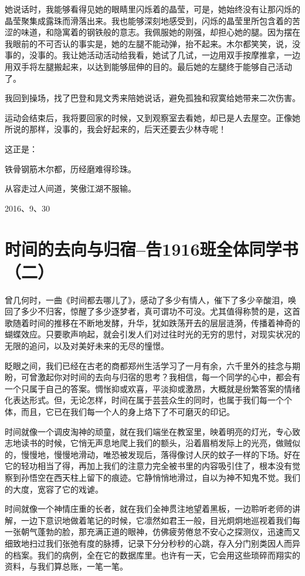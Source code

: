\documentclass[openany]{ctexbook}
\begin{document}
她说话时，我能够看得见她的眼睛里闪烁着的晶莹，可是，她始终没有让那闪烁的晶莹聚集成露珠而滑落出来。我也能够深刻地感受到，闪烁的晶莹里所包含着的苦涩的味道，和隐寓着的钢铁般的意志。我佩服她的刚强，却担心她的腿。因为摆在我眼前的不可否认的事实是，她的左腿不能动弹，抬不起来。木尔都笑笑，说，没事的，没事的。我让她活动活动给我看，她试了几试，一边用双手按摩推拿，一边用双手将左腿搬起来，以达到能够屈伸的目的。最后她的左腿终于能够自己活动了。

我回到操场，找了巴登和晁文秀来陪她说话，避免孤独和寂寞给她带来二次伤害。

运动会结束后，我将要回家的时候，又到观察室去看她，却已是人去屋空。正像她所说的那样，没事的，我会好起来的，后天还要去少林寺呢！

这正是：

铁骨钢筋木尔都，历经磨难得珍珠。

从容走过人间道，笑傲江湖不服输。

2016、9、30

\chapter*{时间的去向与归宿--告1916班全体同学书（二）}\label{letter2}

曾几何时，一曲《时间都去哪儿了》，感动了多少有情人，催下了多少辛酸泪，唤回了多少不归客，惊醒了多少逐梦者，真可谓功不可没。尤其值得称赞的是，这首歌随着时间的推移在不断地发酵，升华，犹如跌荡开去的层层涟漪，传播着神奇的蝴蝶效应。只要歌声响起，就会引发人们对过往时光的无穷的思忖，对现实状况的无限的追问，以及对美好未来的无尽的憧憬。

眨眼之间，我们已经在古老的商都郑州生活学习了一月有余，六千里外的挂念与期盼，可曾激起你对时间的去向与归宿的思考？我相信，每一个同学的心中，都会有一个只属于自己的答案。惆怅抑或欢喜，平淡抑或激昂，大概就是纷繁答案的情绪化表达形式。但，无论怎样，时间在属于芸芸众生的同时，也属于我们每一个个体，而且，它已在我们每一个人的身上烙下了不可磨灭的印记。

时间就像一个调皮淘神的顽童，就在我们端坐在教室里，映着明亮的灯光，专心致志地读书的时候，它悄无声息地爬上我们的额头，沿着眉梢发际上的光亮，做贼似的，慢慢地，慢慢地滑动，唯恐被发现后，落得像讨人厌的蚊子一样的下场。好在它的轻功相当了得，再加上我们的注意力完全被书里的内容吸引住了，根本没有觉察到孙悟空在西天柱上留下的痕迹。它静悄悄地滑过，自以为神不知鬼不觉。我们的大度，宽容了它的戏谑。

时间就像一个神情庄重的长者，就在我们全神贯注地望着黑板，一边聆听老师的讲解，一边下意识地做着笔记的时候，它凛然如君王一般，目光炯炯地巡视着我们每一张朝气蓬勃的脸，那充满正道的眼神，仿佛疲劳倦怠不安心之探测仪，迅速而又细致地扫过我们张弛有度的脉搏，记录下分分秒秒的心跳，存入分门别类因人而异的档案。我们的病例，全在它的数据库里。也许有一天，它会用这些琐碎而翔实的资料，与我们算总账，一笔一笔。
\end{document}
